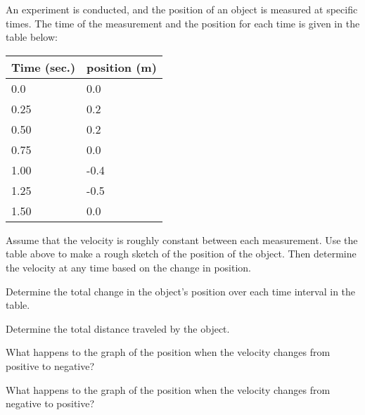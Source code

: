 \begin{problem}
\item An experiment is conducted, and the position of an object is
  measured at specific times. The time of the measurement and the
  position for each time is given in the table below: \\
  \begin{tabular}{l|l}
    Time (sec.) & position (m) \\ \hline
    0.0  & 0.0 \\
    0.25 & 0.2 \\
    0.50 & 0.2 \\
    0.75 & 0.0 \\
    1.00 & -0.4 \\
    1.25 & -0.5 \\
    1.50 & 0.0
  \end{tabular}
  \begin{subproblem}
  \item Assume that the velocity is roughly constant between each
    measurement. Use the table above to make a rough sketch of the
    position of the object. Then determine the velocity at any time
    based on the change in position.

    \scalebox{0.7}{}

    
    \clearpage

  \item Determine the total change in the object's position over each
    time interval in the table.

      \vfill

  \item Determine the total distance traveled by the object.

    \vfill

  \item What happens to the graph of the position when the velocity
    changes from positive to negative?
    \vspace{4em}

  \item What happens to the graph of the position when the velocity
    changes from negative to positive?
    \vspace{4em}

  \end{subproblem}

\end{problem}




